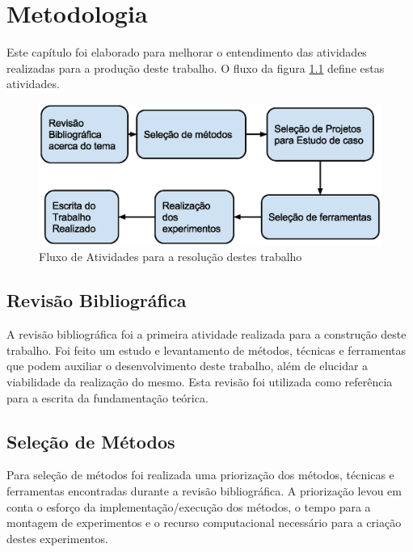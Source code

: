 \chapter[Metodologia]{Metodologia}


Este capítulo foi elaborado para melhorar o entendimento das atividades
 realizadas para a produção deste trabalho. O fluxo da figura 
\ref{fig:fases_metodologia} define estas atividades.

\begin{figure}[h]
    \centering
        \includegraphics[keepaspectratio=true,scale=0.7]{figuras/fases_metodologia.eps}
    \caption{Fluxo de Atividades para a resolução destes trabalho}
    \label{fig:fases_metodologia}
\end{figure}


\section{Revisão Bibliográfica}

A revisão bibliográfica foi a primeira atividade realizada para a construção
 deste trabalho. Foi feito um estudo e levantamento de métodos, técnicas e
 ferramentas que podem auxiliar o desenvolvimento deste trabalho, além de
 elucidar a viabilidade da realização do mesmo. Esta revisão foi utilizada
 como referência para a  escrita da fundamentação teórica.

\section{Seleção de Métodos}

Para seleção de métodos foi realizada uma priorização dos métodos, técnicas e
 ferramentas encontradas durante a revisão bibliográfica. A priorização levou
 em conta o esforço da implementação/execução dos métodos, o tempo para a
 montagem de experimentos e o recurso computacional necessário para a criação
 destes experimentos.


